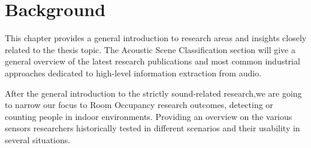 \chapter{Background}
\label{chapter:background} 





 
This chapter provides a general introduction to research areas and insights closely related to the thesis topic.
The Acoustic Scene Classification section will give a general overview of the latest research publications and most common industrial approaches dedicated to high-level information extraction from audio.

After the general introduction to the strictly sound-related research,we are going to narrow our focus to Room Occupancy research outcomes, detecting or counting people in indoor environments. Providing an overview on the various sensors researchers historically tested in different scenarios and their usability in several situations.


